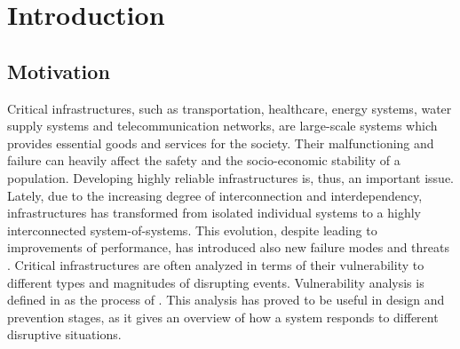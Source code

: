 \documentclass[review]{elsarticle}
\begin{document}
	\section{Introduction}
	\subsection{Motivation}
	Critical infrastructures, such as transportation, healthcare, energy systems, water supply systems and telecommunication networks, are large-scale systems which provides essential goods and services for the society. Their malfunctioning and failure can heavily affect the safety and the socio-economic stability of a population. Developing highly reliable infrastructures is, thus, an important issue. Lately, due to the increasing degree of interconnection and interdependency, infrastructures has transformed from isolated individual systems to a highly interconnected system-of-systems. This evolution, despite leading to improvements of performance, has introduced also new failure modes and threats \cite{buldyrev2010catastrophic}. Critical infrastructures are often analyzed in terms of their vulnerability to different types and magnitudes of disrupting events. Vulnerability analysis is defined in \cite{johansson2011vulnerability} as the process of . This analysis has proved to be useful in design and prevention stages, as it gives an overview of how a system responds to different disruptive situations.
	
\end{document}
